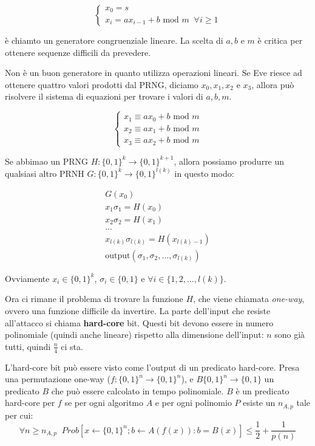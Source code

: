 \[
\begin{cases}
x_0 = s \\ 
x_i = ax_{i-1} + b \text { mod } m \; \; \forall i \geq 1
\end{cases}
\]

è chiamto un generatore congruenziale lineare.
La scelta di $a, b$ e $m$ è critica per ottenere sequenze difficili da prevedere.

Non è un buon generatore in quanto utilizza operazioni lineari. Se Eve riesce ad ottenere quattro valori prodotti dal PRNG, diciamo $x_0, x_1, x_2$ e $x_3$, allora può risolvere il sistema di equazioni per trovare i valori di $a, b, m$.

\[
\begin{cases}
x_1 \equiv ax_0 + b \text{ mod } m\\
x_2 \equiv ax_1 + b \text{ mod } m\\
x_3 \equiv ax_2 + b \text{ mod } m
\end{cases}
\]

Se abbimao un PRNG $H: \{0,1\}^k \rightarrow \{0,1\}^{k+1}$, allora possiamo produrre un qualsiasi altro PRNH $G:\{0,1\}^k \rightarrow \{0,1\}^{l(k)}$ in questo modo:

\begin{align*}
G(x_0)\\
x_1\sigma_1 = H(x_0)\\
x_2\sigma_2 = H(x_1)\\
...\\
x_{l(k)}\sigma_{l(k)} = H(x_{l(k)-1})\\
\text{output} (\sigma_1, \sigma_2, ..., \sigma_{l(k)})
\end{align*}

Ovviamente $x_i \in \{0,1\}^k$, $\sigma_i \in \{0,1\}$ e $\forall i \in \{1, 2, ..., l(k)\}$.

Ora ci rimane il problema di trovare la funzione $H$, che viene chiamata \textit{one-way}, ovvero una funzione difficile da invertire. La parte dell'input che resiste all'attacco si chiama \textbf{hard-core} bit. Questi bit devono essere in numero polinomiale (quindi anche lineare) rispetto alla dimensione dell'input: $n$ sono già tutti, quindi $\frac{n}{4}$ ci sta.


L'hard-core bit può essere visto come l'output di un predicato hard-core. Presa una permutazione one-way ($f: \{0,1\}^n \rightarrow \{0,1\}^n$), e $B\{0,1\}^n \rightarrow \{0,1\}$ un predicato $B$ che può essere calcolato in tempo polinomiale. $B$ è un predicato hard-core per $f$ se per ogni algoritmo $A$ e per ogni polinomio $P$ esiste un $n_{A,p}$ tale per cui:
\begin{equation*}
\forall n \geq n_{A,p} \;\; Prob[x \leftarrow \{0,1\}^n;  b \leftarrow A(f(x)) : b = B(x)] \leq \frac12 + \frac1{p(n)}
\end{equation*}

